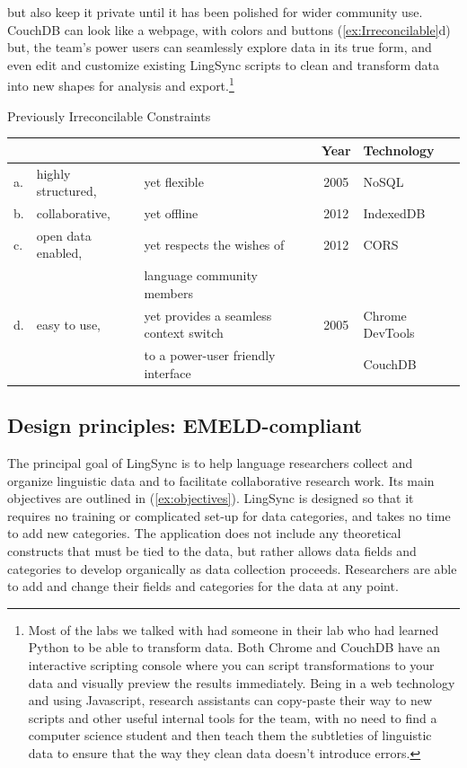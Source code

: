 \documentclass[letterpaper, 12pt, dvips]{mitwpl}
\begin{document}
  but also keep it private until it has been polished for wider community use. 
 CouchDB can look like a webpage, with colors and buttons (\ref{ex:Irreconcilable}d) but, the team's power users can seamlessly explore data in its true form, and even edit and customize existing LingSync scripts to clean and transform data into new shapes for analysis and export.\footnote{Most of the labs we talked with had someone in their lab who had learned Python to be able to transform data. Both Chrome and CouchDB have an interactive scripting console where you can script transformations to your data and visually preview the results immediately. Being in a web technology and using Javascript, research assistants can copy-paste their way to new scripts and other useful internal tools for the team, with no need to find a computer science student and then teach them the subtleties of linguistic data to ensure that the way they clean data doesn't introduce errors. } 

\begin{exe}
\ex  Previously Irreconcilable Constraints

\begin{tabular}{lllcl}
&& & Year & Technology \\\hline\hline
a. & highly structured, & yet flexible & 2005 & NoSQL\\\hline
b. & collaborative, & yet offline  & 2012 &  IndexedDB\\\hline
c. & open data enabled,  &yet respects the wishes of & 2012 & CORS \\
&&   language community members \\\hline
d. & easy to use,  &yet provides a seamless context switch  & 2005 & Chrome DevTools  \\
&& to a power-user friendly interface && CouchDB
\end{tabular}
\label{ex:Irreconcilable}
\end{exe}



\subsection{Design principles: EMELD-compliant} 
\label{sec:design}

The principal goal of LingSync is to help language researchers collect and organize linguistic data and to facilitate collaborative research work. Its main objectives are outlined in (\ref{ex:objectives}). 
LingSync is designed so that it requires no training or complicated set-up for data categories, and takes no time to add new categories.  The application does not include any theoretical constructs that must be tied to the data, but rather allows data fields and categories to develop organically as data collection proceeds. Researchers are able to add and change their fields and categories for the data at any point. 
\end{document}
